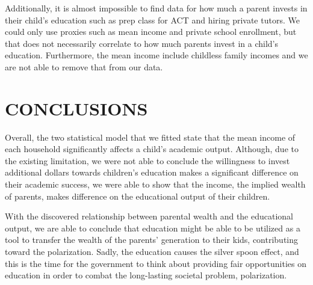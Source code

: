 \documentclass[letterpaper, 10 pt, conference]{ieeeconf}  %
\begin{document}
Additionally, it is almost impossible to find data for how much a parent invests in their child’s education such as prep class for ACT and hiring private tutors.
We could only use proxies such as mean income and private school enrollment, but that does not necessarily correlate to how much parents invest in a child's education.
Furthermore, the mean income include childless family incomes and we are not able to remove that from our data.


\section{CONCLUSIONS}

Overall, the two statistical model that we fitted state that the mean income of each household significantly affects a child's academic output.
Although, due to the existing limitation, we were not able to conclude the willingness to invest additional dollars towards children's education makes a significant difference on their academic success, we were able to show that the income, the implied wealth of parents, makes difference on the educational output of their children.

With the discovered relationship between parental wealth and the educational output, we are able to conclude that education might be able to be utilized as a tool to transfer the wealth of the parents’ generation to their kids, contributing toward the polarization.
Sadly, the education causes the silver spoon effect, and this is the time for the government to think about providing fair opportunities on education in order to combat the long-lasting societal problem, polarization.


\addtolength{\textheight}{-12cm}   %


\end{document}
